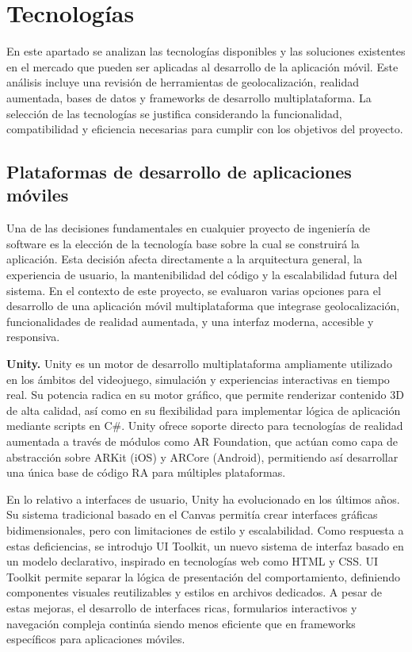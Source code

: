 \section{Tecnologías}
En este apartado se analizan las tecnologías disponibles y las soluciones existentes en el mercado que pueden ser aplicadas al desarrollo de la aplicación móvil. Este análisis incluye una revisión de herramientas de geolocalización, realidad aumentada, bases de datos y frameworks de desarrollo multiplataforma. La selección de las tecnologías se justifica considerando la funcionalidad, compatibilidad y eficiencia necesarias para cumplir con los objetivos del proyecto.

\subsection{Plataformas de desarrollo de aplicaciones móviles}

Una de las decisiones fundamentales en cualquier proyecto de ingeniería de software es la elección de la tecnología base sobre la cual se construirá la aplicación. Esta decisión afecta directamente a la arquitectura general, la experiencia de usuario, la mantenibilidad del código y la escalabilidad futura del sistema. En el contexto de este proyecto, se evaluaron varias opciones para el desarrollo de una aplicación móvil multiplataforma que integrase geolocalización, funcionalidades de realidad aumentada, y una interfaz moderna, accesible y responsiva.

\textbf{Unity.} Unity es un motor de desarrollo multiplataforma ampliamente utilizado en los ámbitos del videojuego, simulación y experiencias interactivas en tiempo real. Su potencia radica en su motor gráfico, que permite renderizar contenido 3D de alta calidad, así como en su flexibilidad para implementar lógica de aplicación mediante scripts en C\#. Unity ofrece soporte directo para tecnologías de realidad aumentada a través de módulos como AR Foundation, que actúan como capa de abstracción sobre ARKit (iOS) y ARCore (Android), permitiendo así desarrollar una única base de código RA para múltiples plataformas.

En lo relativo a interfaces de usuario, Unity ha evolucionado en los últimos años. Su sistema tradicional basado en el Canvas permitía crear interfaces gráficas bidimensionales, pero con limitaciones de estilo y escalabilidad. Como respuesta a estas deficiencias, se introdujo UI Toolkit, un nuevo sistema de interfaz basado en un modelo declarativo, inspirado en tecnologías web como HTML y CSS. UI Toolkit permite separar la lógica de presentación del comportamiento, definiendo componentes visuales reutilizables y estilos en archivos dedicados. A pesar de estas mejoras, el desarrollo de interfaces ricas, formularios interactivos y navegación compleja continúa siendo menos eficiente que en frameworks específicos para aplicaciones móviles.

